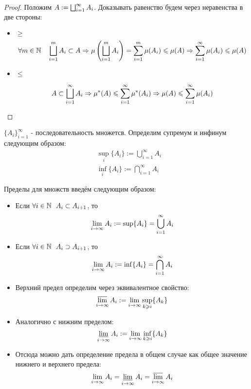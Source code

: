 \begin{proof}
	Положим $A := \bigsqcup_{i = 1}^\infty A_i$. Доказывать равенство будем через неравенства в две стороны:
	\begin{itemize}
		\item $\ge$
		\[
			\forall m \in \mathbb{N} \quad \bigsqcup_{i = 1}^m A_i \subset A \Rightarrow \mu\left(\bigsqcup_{i = 1}^m A_i\right) = \sum_{i = 1}^m \mu(A_i) \leqslant \mu(A) \Rightarrow \sum_{i = 1}^\infty \mu(A_i) \leqslant \mu(A)
		\]
		
		\item $\le$
		
		\[
			A \subset \bigsqcup_{i = 1}^\infty A_i \Rightarrow \mu^*(A) \leqslant \sum_{i = 1}^\infty \mu^*(A_i) \Rightarrow \mu(A) \leqslant \sum_{i = 1}^\infty \mu(A_i)
		\]
	\end{itemize}
\end{proof}

\begin{definition}
	$\{A_i\}_{i = 1}^\infty$ - последовательность множетсв. Определим супремум и инфинум следующим образом:
	\begin{align*}
		&{\sup_i \{A_i\} := \bigcup_{i = 1}^\infty A_i}
		\\
		&{\inf_i \{A_i\} := \bigcap_{i = 1}^\infty A_i}
	\end{align*}
\end{definition}

\begin{definition}
	Пределы для множств введём следующим образом:
	\begin{itemize}
		\item Если $\forall i \in \mathbb{N}\ \ A_i \subset A_{i + 1}$, то
		\[
			\lim\limits_{i \to \infty} A_i := \sup \{A_i\} = \bigcup_{i = 1}^\infty A_i
		\]
		
		\item Если $\forall i \in \mathbb{N}\ \ A_i \supset A_{i + 1}$, то
		\[
			\lim\limits_{i \to \infty} A_i := \inf \{A_i\} = \bigcap_{i = 1}^\infty A_i
		\]
		
		\item Верхний предел определим через эквивалентное свойство:
		\[
			\varlimsup_{i \to \infty} A_i := \lim\limits_{i \to \infty} \sup_{k \geqslant i} \{A_k\}
		\]
		
		\item Аналогично с нижним пределом:
		\[
			\varliminf_{i \to \infty} A_i := \lim\limits_{i \to \infty} \inf_{k \geqslant i} \{A_k\}
		\]
		
		\item Отсюда можно дать определение предела в общем случае как общее значение нижнего и верхнего предела:
		\[
			\lim\limits_{i \to \infty} A_i = \varliminf_{i \to \infty} A_i = \varlimsup_{i \to \infty} A_i
		\]
	\end{itemize}
\end{definition}

